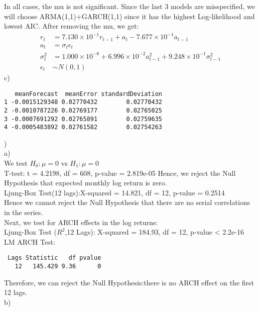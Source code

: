 \documentclass[12pt]{article}
\begin{document}
In all cases, the mu is not significant. Since the last 3 models are misspecified, we will choose ARMA(1,1)+GARCH(1,1) since it has the highest Log-likelihood and lowest AIC. After removing the mu, we get:
\begin{equation*}
\begin{split}
r_{t} &= 7.130\times 10^{-1}r_{t-1}+a_{t}-7.677\times 10^{-1}a_{t-1}\\
a_{t} &= \sigma_{t} \epsilon_{t}\\
\sigma^{2}_{t} &= 1.000\times 10^{-6}+6.996\times 10^{-2}a^{2}_{t-1}+9.248\times 10^{-1}\sigma_{t-1}^{2}\\
\epsilon_{t} &\sim N(0,1)
\end{split}
\end{equation*}
c)\\
\begin{verbatim}
   meanForecast  meanError standardDeviation
1 -0.0015129348 0.02770432        0.02770432
2 -0.0010787226 0.02769177        0.02765025
3 -0.0007691292 0.02765891        0.02759635
4 -0.0005483892 0.02761582        0.02754263
\end{verbatim}
)\\
\bigskip
a)\\
\bigskip
We test $H_{0}:\mu=0$ vs $H_{1}:\mu= 0$\\
T-test: t = 4.2198, df = 608, p-value = 2.819e-05
Hence, we reject the Null Hypothesis that expected monthly log return is zero.\\
Ljung-Box Test(12 lags):X-squared = 14.821, df = 12, p-value = 0.2514\\
Hence we cannot reject the Null Hypothesis that there are no serial correlations in the series.\\
Next, we test for ARCH effects in the log returns:\\
Ljung-Box Test ($R^2$,12 Lags): X-squared = 184.93, df = 12, p-value < 2.2e-16\\
LM ARCH Test:\\
\begin{verbatim}
 Lags Statistic   df pvalue
   12   145.429 9.36      0
\end{verbatim}
Therefore, we can reject the Null Hypothesis:there is no ARCH effect on the first 12 lags.\\
\bigskip
b)\\
\bigskip
\end{document}
